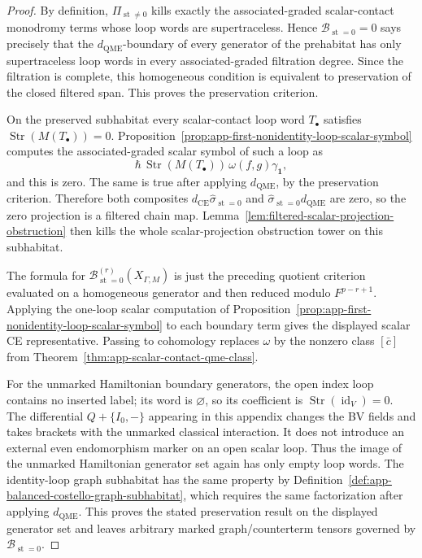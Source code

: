 \begin{proof}
  By definition,
  \(\Pi_{\operatorname{st}\neq0}\) kills exactly the associated-graded
  scalar-contact monodromy terms whose loop words are supertraceless.
  Hence
  \(\mathcal B_{\operatorname{st}=0}=0\) says precisely that the
  \(d_{\mathrm{QME}}\)-boundary of every generator of the prehabitat has
  only supertraceless loop words in every associated-graded filtration
  degree.  Since the filtration is complete, this homogeneous condition
  is equivalent to preservation of the closed filtered span.  This proves
  the preservation criterion.

  On the preserved subhabitat every scalar-contact loop word
  \(T_\bullet\) satisfies
  \(\operatorname{Str}(M(T_\bullet))=0\).  Proposition~\ref{prop:app-first-nonidentity-loop-scalar-symbol}
  computes the associated-graded scalar symbol of such a loop as
  \[
    \hbar\,\operatorname{Str}(M(T_\bullet))\,
    \omega(f,g)\gamma_{\mathbf 1},
  \]
  and this is zero.  The same is true after applying
  \(d_{\mathrm{QME}}\), by the preservation criterion.  Therefore both
  composites
  \(d_{\mathrm{CE}}\widehat\sigma_{\operatorname{st}=0}\) and
  \(\widehat\sigma_{\operatorname{st}=0}d_{\mathrm{QME}}\) are zero, so
  the zero projection is a filtered chain map.  Lemma~\ref{lem:filtered-scalar-projection-obstruction}
  then kills the whole scalar-projection obstruction tower on this
  subhabitat.

  The formula for
  \(\mathcal B^{(r)}_{\operatorname{st}=0}(X_{\Gamma,M})\) is just the
  preceding quotient criterion evaluated on a homogeneous generator and
  then reduced modulo \(F^{p-r+1}\).  Applying the one-loop scalar
  computation of
  Proposition~\ref{prop:app-first-nonidentity-loop-scalar-symbol} to each
  boundary term gives the displayed scalar CE representative.  Passing to
  cohomology replaces \(\omega\) by the nonzero class
  \([\bar c]\) from
  Theorem~\ref{thm:app-scalar-contact-qme-class}.

  For the unmarked Hamiltonian boundary generators, the open index loop
  contains no inserted label; its word is \(\varnothing\), so its
  coefficient is
  \(\operatorname{Str}(\operatorname{id}_V)=0\).  The differential
  \(Q+\{I_0,-\}\) appearing in this appendix changes the BV fields and
  takes brackets with the unmarked classical interaction.  It does not
  introduce an external even endomorphism marker on an open scalar loop.
  Thus the image of the unmarked Hamiltonian generator set again has only
  empty loop words.  The identity-loop graph subhabitat has the same
  property by
  Definition~\ref{def:app-balanced-costello-graph-subhabitat}, which
  requires the same factorization after applying \(d_{\mathrm{QME}}\).
  This proves the stated preservation result on the displayed generator
  set and leaves arbitrary marked graph/counterterm tensors governed by
  \(\mathcal B_{\operatorname{st}=0}\).
\end{proof}


